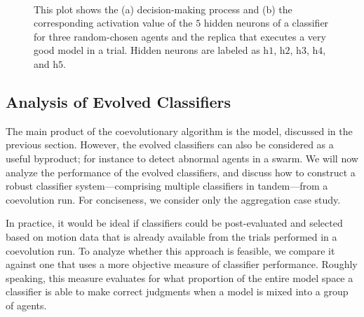 \begin{figure}[!t]%
	\centering
		\\
		\caption{This plot shows the (a) decision-making process and (b) the corresponding activation value of the $5$ hidden neurons of a classifier for three random-chosen agents and the replica that executes a very good model in a trial. Hidden neurons are labeled as $\textrm{h}1$, $\textrm{h}2$, $\textrm{h}3$, $\textrm{h}4$, and $\textrm{h}5$.}
		\label{fig:classifier_output}
\end{figure}

\subsection{Analysis of Evolved Classifiers}\label{sec:analysis_evolved_classifiers_swarm_simulation}

The main product of the coevolutionary algorithm is the model, discussed in the previous section. However, the evolved classifiers can also be considered as a useful byproduct; for instance to detect abnormal agents in a swarm. We will now analyze the performance of the evolved classifiers, and discuss how to construct a robust classifier system---comprising multiple classifiers in tandem---from a coevolution run. For conciseness, we consider only the aggregation case study.

In practice, it would be ideal if classifiers could be post-evaluated and selected based on motion data that is already available from the trials performed in a coevolution run. To analyze whether this approach is feasible, we compare it against one that uses a more objective measure of classifier performance. Roughly speaking, this measure evaluates for what proportion of the entire model space a classifier is able to make correct judgments when a model is mixed into a group of agents.

